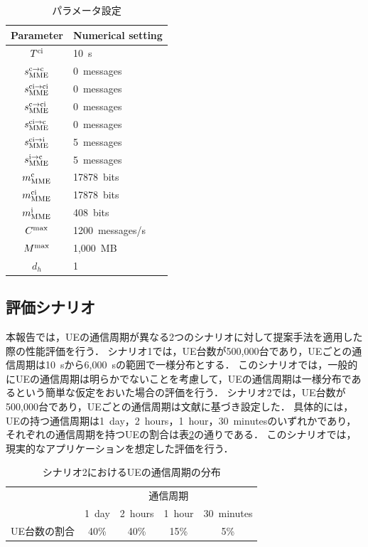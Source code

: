 \documentclass[technicalreport]{ieicej-rev}
\begin{document}
\begin{table}[!t]
  \centering
  \caption{パラメータ設定}
  \label{table:parameter}
  \begin{tabular}{c|l}
    \hline
    Parameter  & Numerical setting \\\hline \hline
    $T^{\rm ci}$ & 10~s\\
    $s_{\rm MME}^{\rm c \to \rm c}$ & 0~messages\\
    $s_{\rm MME}^{\rm ci \to \rm ci}$ & 0~messages\\
    $s_{\rm MME}^{\rm c \to \rm ci}$ & 0~messages\\
    $s_{\rm MME}^{\rm ci \to \rm c}$ & 0~messages\\
    $s_{\rm MME}^{\rm ci \to \rm i}$ & 5~messages\\
    $s_{\rm MME}^{\rm i \to \rm c}$ & 5~messages\\
    $m^{\rm c}_{\rm MME}$ & 17878~bits\\
    $m^{\rm ci}_{\rm MME}$ & 17878~bits\\
    $m^{\rm i}_{\rm MME}$ & 408~bits\\
    $C^{\rm max}$ & 1200~messages/s\\
    $M^{\rm max}$ & 1,000~MB\\
    $d_h$ & 1 \\\hline
  \end{tabular}
\end{table}

\subsection{評価シナリオ}
\label{sec:estimate4}
本報告では，UEの通信周期が異なる2つのシナリオに対して提案手法を適用した際の性能評価を行う．
シナリオ1では，UE台数が500,000台であり，UEごとの通信周期は10~sから6,000~sの範囲で一様分布とする．
このシナリオでは，一般的にUEの通信周期は明らかでないことを考慮して，UEの通信周期は一様分布であるという簡単な仮定をおいた場合の評価を行う．
シナリオ2では，UE台数が500,000台であり，UEごとの通信周期は文献\cite{3gpp.45.820}に基づき設定した．
具体的には，UEの持つ通信周期は1~day，2~hours，1~hour，30~minutesのいずれかであり，それぞれの通信周期を持つUEの割合は表\ref{table:interval}の通りである．
このシナリオでは，現実的なアプリケーションを想定した評価を行う．
\begin{table}[!t]
  \centering
  \caption{シナリオ2におけるUEの通信周期の分布}
  \label{table:interval}
  \begin{tabular}{c|cccc}
    \hline
    &\multicolumn{4}{c}{通信周期} \\
    & 1~day & 2~hours & 1~hour & 30~minutes \\\hline \hline
    UE台数の割合 & 40\% & 40\% & 15\% & 5\% \\\hline
  \end{tabular}
\end{table}
\end{document}

